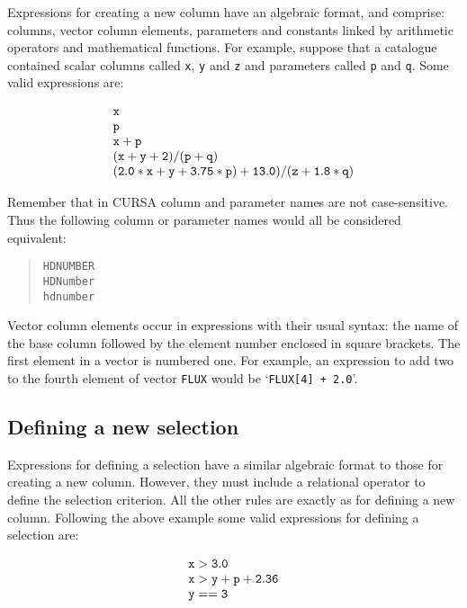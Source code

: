 \documentclass[twoside,11pt]{article}
\renewcommand{\_}{\texttt{\symbol{95}}}
\begin{document}
Expressions for creating a new column have an algebraic format, and comprise: 
columns, vector column elements, parameters and constants linked by 
arithmetic operators and mathematical functions. For example, suppose that 
a catalogue contained scalar columns called {\tt x}, {\tt y} and {\tt z} 
and parameters called {\tt p} and {\tt q}.  Some valid expressions are:

\begin{equation}
\begin{array}{l}
{\tt x}  \\
{\tt p}  \\
{\tt x + p}  \\
{\tt (x + y + 2) / (p + q)}  \\
{\tt (2.0*x + y + 3.75*p) + 13.0) / (z + 1.8*q)}
\end{array}
\end{equation}

Remember that in CURSA column and parameter names are not case-sensitive.
Thus the following column or parameter names would all be considered
equivalent:

\begin{verse}
{\tt HD\_NUMBER} \\
{\tt HD\_Number} \\
{\tt hd\_number}
\end{verse}

Vector column elements occur in expressions with their usual syntax: 
the name of the base column followed by the element number enclosed 
in square brackets. The first element in a vector is numbered one. For 
example, an expression to add two to the fourth element of vector 
{\tt FLUX} would be `{\tt FLUX[4] + 2.0}'.

\subsection{Defining a new selection}

Expressions for defining a selection have a similar algebraic format to
those for creating a new column.  However, they must include a
relational operator to define the selection criterion.  All the other
rules are exactly as for defining a new column.  Following the above
example some valid expressions for defining a selection are:

\begin{equation}
\begin{array}{l}
{\tt x > 3.0}  \\
{\tt x > y + p + 2.36}  \\
{\tt y == 3}
\end{array}
\end{equation}
\end{document}
